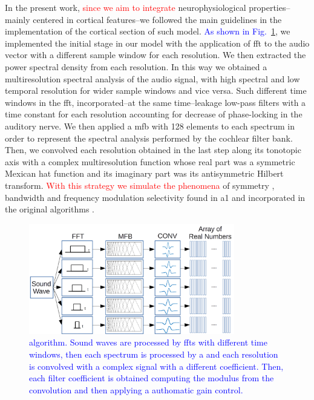 \documentclass[10pt,letterpaper]{article}
\begin{document}
In the present work, \textcolor{red}{since we aim to integrate} neurophysiological
properties--mainly centered in cortical features--we followed the main guidelines in the implementation of the cortical section of such model. 
\textcolor{blue}{As shown in Fig.~\ref{fig:MRSTSA}}, we implemented the initial stage in our model with the application of \gls{fft} to the audio vector
with a different sample window for each resolution.
We then extracted the power spectral density from each resolution.
In this way we obtained a multiresolution spectral analysis of the audio signal,
with high spectral and low temporal resolution for wider sample windows and
vice versa.
Such different time windows in the \gls{fft},
incorporated--at the same time--leakage low-pass filters with a time constant for each
resolution accounting for decrease of phase-locking in the auditory nerve.
We then applied a \gls{mfb} with 128 elements to each spectrum
in order to represent the spectral analysis performed by the cochlear filter bank.
Then, we convolved each resolution obtained in the last step along its tonotopic axis
with a complex multiresolution function whose real part
was a symmetric Mexican hat function and its imaginary part was its antisymmetric Hilbert transform.
\textcolor{red}{With this strategy we simulate the phenomena} of symmetry \cite{shamma_1993}, bandwidth \cite{schreiner_1990}
and frequency modulation selectivity \cite{shamma_1993,heil_1992,mendelson_1985}
found in \gls{a1} and incorporated in the original algorithms \cite{wang_1995}.

\begin{figure}[h!]
    \centering
    \includegraphics[width=0.8\textwidth]{MRSTSA.png}
    \caption{\textcolor{blue}{ algorithm. Sound waves are processed by \glspl{fft} with different time windows, then each spectrum is processed by
    a  and each resolution is convolved with a complex signal with a different coefficient. Then, each filter coefficient
    is obtained computing the modulus from the convolution and then applying a authomatic gain control.}}
    \label{fig:MRSTSA}
\end{figure}
\end{document}
